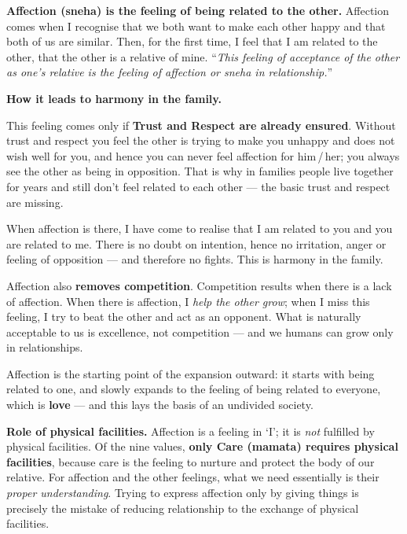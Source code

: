 \ans \textbf{Affection (sneha) is the feeling of being related to the other.}
Affection comes when I recognise that we both want to make each other happy
and that both of us are similar. Then, for the first time, I feel that I am
related to the other, that the other is a relative of mine. ``\emph{This
feeling of acceptance of the other as one's relative is the feeling of
affection or sneha in relationship.}''

\textbf{How it leads to harmony in the family.}

\begin{abul}
\item This feeling comes only if \textbf{Trust and Respect are already
      ensured}. Without trust and respect you feel the other is trying to make
      you unhappy and does not wish well for you, and hence you can never feel
      affection for him\,/\,her; you always see the other as being in
      opposition. That is why in families people live together for years and
      still don't feel related to each other --- the basic trust and respect
      are missing.
\item When affection is there, I have come to realise that I am related to you
      and you are related to me. There is no doubt on intention, hence no
      irritation, anger or feeling of opposition --- and therefore no fights.
      This is harmony in the family.
\item Affection also \textbf{removes competition}. Competition results when
      there is a lack of affection. When there is affection, I \emph{help the
      other grow}; when I miss this feeling, I try to beat the other and act
      as an opponent. What is naturally acceptable to us is excellence, not
      competition --- and we humans can grow only in relationships.
\item Affection is the starting point of the expansion outward: it starts with
      being related to one, and slowly expands to the feeling of being related
      to everyone, which is \textbf{love} --- and this lays the basis of an
      undivided society.
\end{abul}

\textbf{Role of physical facilities.} Affection is a feeling in `I'; it is
\emph{not} fulfilled by physical facilities. Of the nine values, \textbf{only
Care (mamata) requires physical facilities}, because care is the feeling to
nurture and protect the body of our relative. For affection and the other
feelings, what we need essentially is their \emph{proper understanding}.
Trying to express affection only by giving things is precisely the mistake of
reducing relationship to the exchange of physical facilities.

